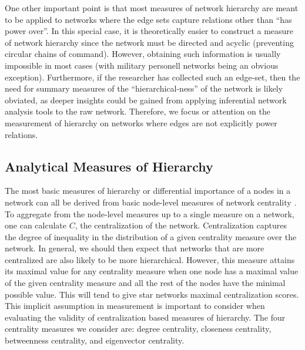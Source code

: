 \documentclass[3p,times]{elsarticle}
\begin{document}
One other important point is that most measures of network hierarchy are meant to be applied to networks where the edge sets capture relations other than ``has power over''. In this special case, it is theoretically easier to construct a measure of network hierarchy since the network must be directed and acyclic (preventing circular chains of command). However, obtaining such information is usually impossible in most cases (with military personell networks being an obvious exception). Furthermore, if the researcher has collected such an edge-set, then the need for summary measures of the ``hierarchical-ness'' of the network is likely obviated, as deeper insights could be gained from applying inferential network analysis tools to the raw network. Therefore, we focus or attention on the measurement of hierarchy on networks where edges are not explicitly power relations.

\subsection{Analytical Measures of Hierarchy}
The most basic measures of hierarchy or differential importance of a nodes in a network can all be derived from basic node-level measures of network centrality \cite{Wasserman1994}. To aggregate from the node-level measures up to a single measure on a network, one can calculate $C$, the centralization of the network. Centralization captures the degree of inequality in the distribution of a given centrality measure over the network. In general, we should then expect that networks that are more centralized are also likely to be more hierarchical. However, this measure attains its maximal value for any centrality measure when one node has a maximal value of the given centrality measure and all the rest of the nodes have the minimal possible value. This will tend to give star networks maximal centralization scores. This implicit assumption in measurement is important to consider when evaluating the validity of centralization based measures of hierarchy. The four centrality measures we consider are: degree centrality, closeness centrality, betweenness centrality, and eigenvector centrality. 
\end{document}

